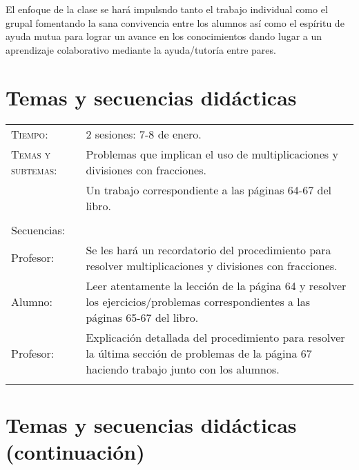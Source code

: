 \documentclass[letterpaper,10pt]{article}
\begin{document}
\vspace{5mm}

El enfoque de la clase se har\'a impulsndo tanto el trabajo individual como el 
grupal fomentando la sana convivencia entre los alumnos as\'i como el esp\'iritu
de ayuda mutua para lograr un avance en los conocimientos dando lugar a un 
aprendizaje colaborativo mediante la ayuda/tutor\'ia entre pares.

\vspace{5mm}

\section{Temas  y secuencias did\'acticas}
\begin{tabular}[t]{R{0.25\textwidth}p{0.71\textwidth}}
    \textsc{Tiempo:}                    & 2 sesiones: 7-8 de enero. \\
    \textsc{Temas y subtemas:}          & Problemas que implican el uso de multiplicaciones y divisiones con fracciones.\\
              & Un trabajo correspondiente a las 
    p\'aginas 64-67 del libro. \\ \\
    \large{\sc Secuencias:} \\
    Profesor:   & Se les har\'a un recordatorio del procedimiento para resolver 
    multiplicaciones y divisiones con fracciones. \\
    Alumno:     & Leer atentamente la lecci\'on de la p\'agina 64 y resolver los 
    ejercicios/problemas correspondientes a las p\'aginas 65-67 del libro. \\
    Profesor: & Explicación detallada del procedimiento para resolver la \'ultima
    secci\'on de problemas de la p\'agina 67 haciendo trabajo junto con los 
    alumnos. \\ \\
\hline

\end{tabular}

\newpage

\section{Temas  y secuencias did\'acticas (continuaci\'on)}
\end{document}
